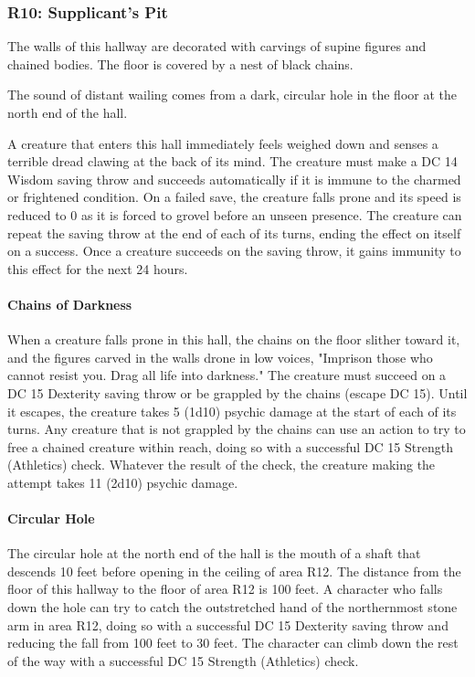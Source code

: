 \documentclass[10pt,a4paper,twoside,twocolumn,openany,nodeprecatedcode]{dndbook}
\begin{document}
\subsubsection{R10: Supplicant's Pit}
\begin{DndReadAloud}{}
The walls of this hallway are decorated with carvings of supine figures and chained bodies. The floor is covered by a nest of black chains.

The sound of distant wailing comes from a dark, circular hole in the floor at the north end of the hall.

\end{DndReadAloud}

A creature that enters this hall immediately feels weighed down and senses a terrible dread clawing at the back of its mind. The creature must make a DC 14 Wisdom saving throw and succeeds automatically if it is immune to the charmed or frightened condition. On a failed save, the creature falls prone and its speed is reduced to 0 as it is forced to grovel before an unseen presence. The creature can repeat the saving throw at the end of each of its turns, ending the effect on itself on a success. Once a creature succeeds on the saving throw, it gains immunity to this effect for the next 24 hours.

\paragraph{Chains of Darkness}
When a creature falls prone in this hall, the chains on the floor slither toward it, and the figures carved in the walls drone in low voices, "Imprison those who cannot resist you. Drag all life into darkness." The creature must succeed on a DC 15 Dexterity saving throw or be grappled by the chains (escape DC 15). Until it escapes, the creature takes 5 (1d10) psychic damage at the start of each of its turns. Any creature that is not grappled by the chains can use an action to try to free a chained creature within reach, doing so with a successful DC 15 Strength (Athletics) check. Whatever the result of the check, the creature making the attempt takes 11 (2d10) psychic damage.

\paragraph{Circular Hole}
The circular hole at the north end of the hall is the mouth of a shaft that descends 10 feet before opening in the ceiling of area R12. The distance from the floor of this hallway to the floor of area R12 is 100 feet. A character who falls down the hole can try to catch the outstretched hand of the northernmost stone arm in area R12, doing so with a successful DC 15 Dexterity saving throw and reducing the fall from 100 feet to 30 feet. The character can climb down the rest of the way with a successful DC 15 Strength (Athletics) check.
\end{document}
